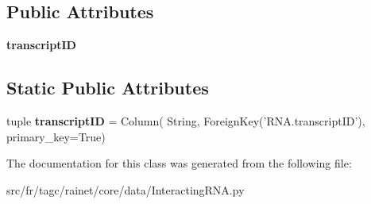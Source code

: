\subsection*{Public Attributes}
\begin{DoxyCompactItemize}
\item 
\hypertarget{classsrc_1_1fr_1_1tagc_1_1rainet_1_1core_1_1data_1_1InteractingRNA_1_1InteractingRNA_ae1d8c65a8e43e46648ce6f3a1c977752}{{\bfseries transcript\-I\-D}}\label{classsrc_1_1fr_1_1tagc_1_1rainet_1_1core_1_1data_1_1InteractingRNA_1_1InteractingRNA_ae1d8c65a8e43e46648ce6f3a1c977752}

\end{DoxyCompactItemize}
\subsection*{Static Public Attributes}
\begin{DoxyCompactItemize}
\item 
\hypertarget{classsrc_1_1fr_1_1tagc_1_1rainet_1_1core_1_1data_1_1InteractingRNA_1_1InteractingRNA_af6eb5c1cb3bc037cf4a68e4d4e33fe06}{tuple {\bfseries transcript\-I\-D} = Column( String, Foreign\-Key('R\-N\-A.\-transcript\-I\-D'), primary\-\_\-key=True)}\label{classsrc_1_1fr_1_1tagc_1_1rainet_1_1core_1_1data_1_1InteractingRNA_1_1InteractingRNA_af6eb5c1cb3bc037cf4a68e4d4e33fe06}

\end{DoxyCompactItemize}


The documentation for this class was generated from the following file\-:\begin{DoxyCompactItemize}
\item 
src/fr/tagc/rainet/core/data/Interacting\-R\-N\-A.\-py\end{DoxyCompactItemize}
